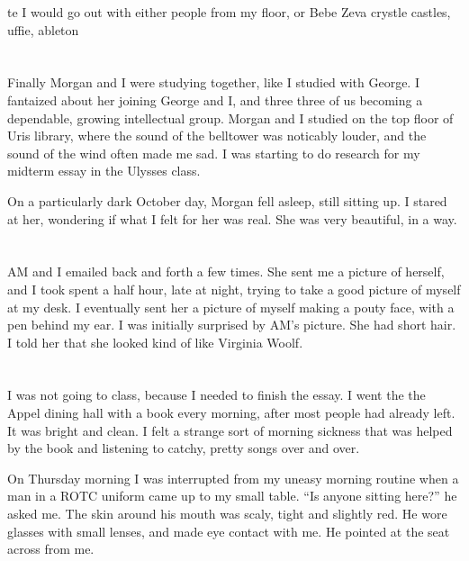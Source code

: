 te I would go out with either people from my floor, or Bebe Zeva crystle
castles, uffie, ableton

\section{}

Finally Morgan and I were studying together, like I studied with George.  I
fantaized about her joining George and I, and three three of us becoming a
dependable,  growing intellectual group.  Morgan and I studied on the top floor
of Uris library, where the sound of the belltower was noticably louder, and the
sound of the wind often made me sad.  I was starting to do research for my
midterm essay in the Ulysses class.  

On a particularly dark October day, Morgan fell asleep, still sitting up.  I
stared at her, wondering if what I felt for her was real.  She was very
beautiful, in a way.  

\section{}

AM and I emailed back and forth a few times.  She sent me a picture of herself,
and I took spent a half hour, late at night, trying to take a good picture of
myself at my desk.  I eventually sent her a picture of myself making a pouty
face, with a pen behind my ear.  I was initially surprised by AM's picture.  She
had short hair.  I told her that she looked kind of like Virginia Woolf.  


\section{}

I was not going to class, because I needed to finish the essay.  I went the the
Appel dining hall with a book every morning, after most people had already left.
It was bright and clean.  I felt a strange sort of morning sickness that was
helped by the book and listening to catchy, pretty songs over and over.  

On Thursday morning I was interrupted from my uneasy morning routine when a man
in a ROTC uniform came up to my small table.  ``Is anyone sitting here?'' he
asked me.  The skin around his mouth was scaly, tight and slightly red.  He wore
glasses with small lenses, and made eye contact with me.  He pointed at the seat
across from me.  

